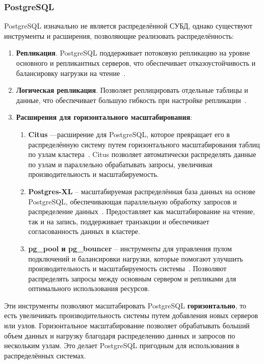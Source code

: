 \subsubsection{PostgreSQL}

PostgreSQL изначально не является распределённой СУБД, однако существуют инструменты и расширения, позволяющие реализовать распределённость:

\begin{enumerate}[wide=12.5mm, leftmargin=12.5mm]
    \item \textbf{Репликация}. PostgreSQL поддерживает потоковую репликацию на уровне основного и репликантных серверов, что обеспечивает отказоустойчивость и балансировку нагрузки на чтение~\cite{postgres-rep}.
    \item \textbf{Логическая репликация}. Позволяет реплицировать отдельные таблицы и данные, что обеспечивает большую гибкость при настройке репликации~\cite{postgres-rep}.
    \item \textbf{Расширения для горизонтального масштабирования}:
    \begin{enumerate}[wide=12.5mm, leftmargin=12.5mm]
        \item \textbf{Citus} ---расширение для PostgreSQL, которое превращает его в распределённую систему путем горизонтального масштабирования таблиц по узлам кластера~\cite{citusdata}. Citus позволяет автоматически распределять данные по узлам и параллельно обрабатывать запросы, увеличивая производительность и масштабируемость.
        \item \textbf{Postgres-XL} -- масштабируемая распределённая база данных на основе PostgreSQL, обеспечивающая параллельную обработку запросов и распределение данных~\cite{postgres-xl}. Предоставляет как масштабирование на чтение, так и на запись, поддерживает транзакции и обеспечивает согласованность данных в кластере.
        \item \textbf{pg\_pool и pg\_bouncer} -- инструменты для управления пулом подключений и балансировки нагрузки, которые помогают улучшить производительность и масштабируемость системы~\cite{pgpool}\cite{pgbouncer}. Позволяют распределять запросы между основным сервером и репликами для оптимального использования ресурсов.
    \end{enumerate}
\end{enumerate}

Эти инструменты позволяют масштабировать PostgreSQL \textbf{горизонтально}, то есть увеличивать производительность системы путем добавления новых серверов или узлов. 
Горизонтальное масштабирование позволяет обрабатывать больший объем данных и нагрузку благодаря распределению данных и запросов по нескольким узлам. 
Это делает PostgreSQL пригодным для использования в распределённых системах.

